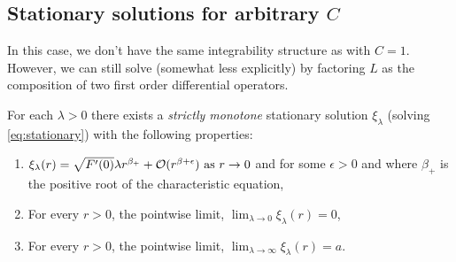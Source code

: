 \documentclass{amsart}
\begin{document}
\subsection{Stationary solutions for arbitrary \(C\)}

In this case, we don't have the same integrability structure as with \(C = 1\). However, we can still solve (somewhat less explicitly) by factoring \(L\) as the composition of two first order differential operators.

\begin{lemma}
\label{lem:stationaryC}
For each \(\lambda > 0 \) there exists a \emph{strictly monotone} stationary solution \(\xi_{\lambda}\) (solving \eqref{eq:stationary}) with the following properties:
\begin{enumerate}
\item \(\xi_{\lambda} (r) = \sqrt{F'(0)} \lambda r^{\beta_+} + \operatorname{\mathcal{O}}(r^{\beta + \epsilon}) \text{ as } r \to 0\) and for some \(\epsilon > 0\) and where \(\beta_+\) is the positive root of the characteristic equation, \label{itm:stationaryC_asymptotic}
\item For every \(r > 0\), the pointwise limit, \(\lim_{\lambda \to 0} \xi_{\lambda} (r) = 0\), \label{itm:stationaryC_lambda_0}
\item For every \(r > 0\), the pointwise limit, \(\lim_{\lambda \to \infty} \xi_{\lambda} (r) = a\). \label{itm:stationaryC_lambda_infty}
\end{enumerate}
\end{lemma}
\end{document}
